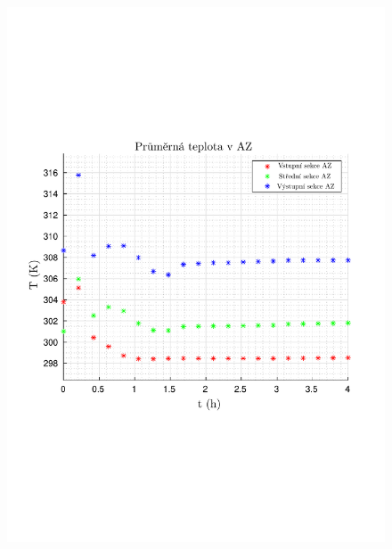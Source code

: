 \begin{figure}[H]
	\centering
	\begin{minipage}{.5\textwidth}
		\centering
		\includegraphics[width=\textwidth, trim={1cm 7cm 1cm 7cm}, clip]{./06_hodnoceni_TH_modelu/obrazky/cfd_triga_temperatures.pdf}
	\end{minipage}%
	\begin{minipage}{.5\textwidth}
		\centering

\end{minipage}
\end{figure}
